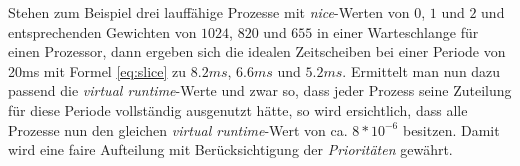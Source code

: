 Stehen zum Beispiel drei lauffähige Prozesse  mit \textit{nice}-Werten von  $0$, $1$ und $2$ und entsprechenden Gewichten von $1024$, $820$ und $655$ in einer Warteschlange für einen Prozessor, dann ergeben sich die idealen Zeitscheiben bei einer Periode von 20ms mit Formel \ref{eq:slice} zu $8.2ms$, $6.6ms$ und $5.2ms$. Ermittelt man nun dazu passend die \textit{virtual runtime}-Werte und zwar so, dass jeder Prozess seine Zuteilung für diese Periode vollständig ausgenutzt hätte, so wird ersichtlich, dass alle Prozesse nun den gleichen \textit{virtual runtime}-Wert von ca. $8*10^{-6}$ besitzen. Damit wird eine faire Aufteilung mit Be\-rück\-sichtigung der \textit{Prioritäten} gewährt.







